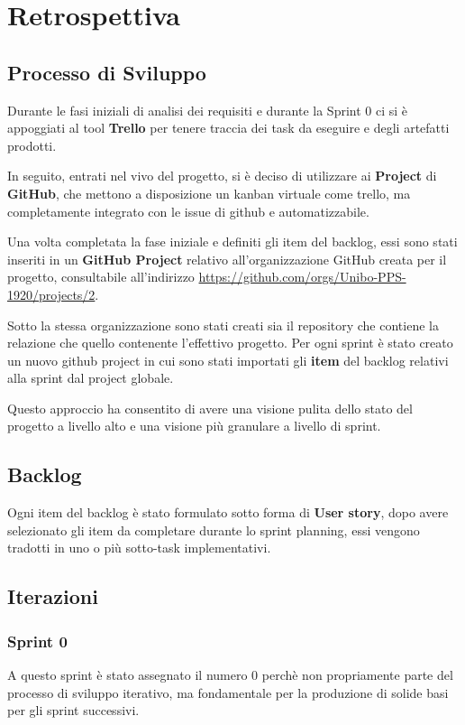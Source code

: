 \chapter{Retrospettiva}

\section{Processo di Sviluppo}
Durante le fasi iniziali di analisi dei requisiti e durante la Sprint 0 ci si è appoggiati al tool \textbf{Trello} per tenere traccia dei task da eseguire e degli artefatti prodotti.

In seguito, entrati nel vivo del progetto, si è deciso di utilizzare ai \textbf{Project} di \textbf{GitHub}, che mettono a disposizione un kanban virtuale come trello, ma completamente integrato con le issue di github e automatizzabile.


Una volta completata la fase iniziale e definiti gli item del backlog, essi sono stati inseriti in un \textbf{GitHub Project} relativo all'organizzazione GitHub creata per il progetto, consultabile all'indirizzo \url{https://github.com/orgs/Unibo-PPS-1920/projects/2}.

Sotto la stessa organizzazione sono stati creati sia il repository che contiene la relazione che quello contenente l'effettivo progetto.
Per ogni sprint è stato creato un nuovo github project in cui sono stati importati gli \textbf{item} del backlog relativi alla sprint dal project globale.

Questo approccio ha consentito di avere una visione pulita dello stato del progetto a livello alto e una visione più granulare a livello di sprint.

\section{Backlog}
Ogni item del backlog è stato formulato sotto forma di \textbf{User story}, dopo avere selezionato gli item da completare durante lo sprint planning, essi vengono tradotti in uno o più sotto-task implementativi.

\section{Iterazioni}
\subsection{Sprint 0}
A questo sprint è stato assegnato il numero 0 perchè non propriamente parte del processo di sviluppo iterativo, ma fondamentale per la produzione di solide basi per gli sprint successivi.
